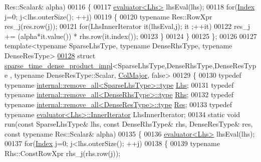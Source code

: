 \begin{DoxyCode}
      Res::Scalar& alpha)
00116   \{
00117     \hyperlink{struct_eigen_1_1internal_1_1evaluator}{evaluator<Lhs>} lhsEval(lhs);
00118     \textcolor{keywordflow}{for}(\hyperlink{namespace_eigen_a62e77e0933482dafde8fe197d9a2cfde}{Index} j=0; j<lhs.outerSize(); ++j)
00119     \{
00120       \textcolor{keyword}{typename} Res::RowXpr res\_j(res.row(j));
00121       \textcolor{keywordflow}{for}(LhsInnerIterator it(lhsEval,j); it ;++it)
00122         res\_j += (alpha*it.value()) * rhs.row(it.index());
00123     \}
00124   \}
00125 \};
00126 
00127 \textcolor{keyword}{template}<\textcolor{keyword}{typename} SparseLhsType, \textcolor{keyword}{typename} DenseRhsType, \textcolor{keyword}{typename} DenseResType>
\hyperlink{struct_eigen_1_1internal_1_1sparse__time__dense__product__impl_3_01_sparse_lhs_type_00_01_dense_67299fc86a44049a87b7e209695d23ff}{00128} \textcolor{keyword}{struct }\hyperlink{struct_eigen_1_1internal_1_1sparse__time__dense__product__impl}{sparse\_time\_dense\_product\_impl}<SparseLhsType,DenseRhsType,DenseResType
      , typename DenseResType::Scalar, \hyperlink{group__enums_ggaacded1a18ae58b0f554751f6cdf9eb13a0cbd4bdd0abcfc0224c5fcb5e4f6669a}{ColMajor}, false>
00129 \{
00130   \textcolor{keyword}{typedef} \textcolor{keyword}{typename} \hyperlink{group___sparse_core___module}{internal::remove\_all<SparseLhsType>::type} 
      \hyperlink{group___sparse_core___module}{Lhs};
00131   \textcolor{keyword}{typedef} \textcolor{keyword}{typename} \hyperlink{group___sparse_core___module}{internal::remove\_all<DenseRhsType>::type} 
      \hyperlink{group___sparse_core___module}{Rhs};
00132   \textcolor{keyword}{typedef} \textcolor{keyword}{typename} \hyperlink{group___sparse_core___module}{internal::remove\_all<DenseResType>::type} 
      \hyperlink{group___sparse_core___module}{Res};
00133   \textcolor{keyword}{typedef} \textcolor{keyword}{typename} \hyperlink{struct_eigen_1_1internal_1_1evaluator}{evaluator<Lhs>::InnerIterator} LhsInnerIterator;
00134   \textcolor{keyword}{static} \textcolor{keywordtype}{void} run(\textcolor{keyword}{const} SparseLhsType& lhs, \textcolor{keyword}{const} DenseRhsType& rhs, DenseResType& res, \textcolor{keyword}{const} \textcolor{keyword}{typename} 
      Res::Scalar& alpha)
00135   \{
00136     \hyperlink{struct_eigen_1_1internal_1_1evaluator}{evaluator<Lhs>} lhsEval(lhs);
00137     \textcolor{keywordflow}{for}(\hyperlink{namespace_eigen_a62e77e0933482dafde8fe197d9a2cfde}{Index} j=0; j<lhs.outerSize(); ++j)
00138     \{
00139       \textcolor{keyword}{typename} Rhs::ConstRowXpr rhs\_j(rhs.row(j));

\end{DoxyCode}
